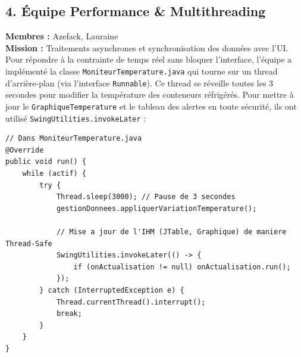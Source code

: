 \documentclass[11pt,a4paper]{article}
\begin{document}
\subsection{4. Équipe Performance \& Multithreading}
\textbf{Membres :} Azefack, Lauraine \\[0.2cm]
\textbf{Mission :} Traitements asynchrones et synchronisation des données avec l'UI.\\[0.2cm]
Pour répondre à la contrainte de temps réel sans bloquer l'interface, l'équipe a implémenté la classe \texttt{MoniteurTemperature.java} qui tourne sur un thread d'arrière-plan (via l'interface \texttt{Runnable}). Ce thread se réveille toutes les 3 secondes pour modifier la température des conteneurs réfrigérés. 
Pour mettre à jour le \texttt{GraphiqueTemperature} et le tableau des alertes en toute sécurité, ils ont utilisé \texttt{SwingUtilities.invokeLater} :
\begin{lstlisting}
// Dans MoniteurTemperature.java
@Override
public void run() {
    while (actif) {
        try {
            Thread.sleep(3000); // Pause de 3 secondes
            gestionDonnees.appliquerVariationTemperature();
            
            // Mise a jour de l'IHM (JTable, Graphique) de maniere Thread-Safe
            SwingUtilities.invokeLater(() -> {
                if (onActualisation != null) onActualisation.run();
            });
        } catch (InterruptedException e) {
            Thread.currentThread().interrupt();
            break;
        }
    }
}
\end{lstlisting}
\end{document}
